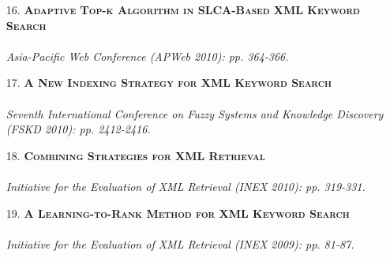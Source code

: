 \documentclass[a4paper, 11pt]{article}
\begin{document}
\begin{itemize}
\item[\color{bl3} 16.]{\scshape\color{bl3}\bf Adaptive Top-k Algorithm in SLCA-Based XML Keyword Search}\\
\\
\emph{ Asia-Pacific Web Conference (APWeb 2010): pp. 364-366.}
\vspace{2mm}

\item[\color{bl3} 17.]{\scshape\color{bl3}\bf A New Indexing Strategy for XML Keyword Search}\\
\\
\emph{ Seventh International Conference on Fuzzy Systems and Knowledge Discovery (FSKD 2010): pp. 2412-2416.}
\vspace{2mm}

\item[\color{bl3} 18.]{\scshape\color{bl3}\bf Combining Strategies for XML Retrieval}\\
\\
\emph{ Initiative for the Evaluation of XML Retrieval (INEX 2010): pp. 319-331.}\\
\color{red}{\bf (INEX 2010 Best Student Paper Award)}
\vspace{2mm}


\item[\color{bl3} 19.]{\scshape\color{bl3}\bf A Learning-to-Rank Method for XML Keyword Search}\\
\\
\emph{ Initiative for the Evaluation of XML Retrieval (INEX 2009): pp. 81-87.}

 \end{itemize}        
\end{document}
